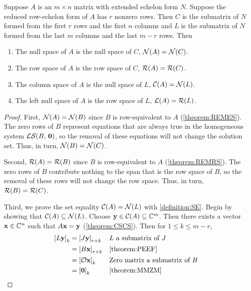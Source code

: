\documentclass{ximera}
\begin{document}
\begin{theorem}
\label{theorem:FS}
Suppose $A$ is an $m\times n$ matrix with extended echelon form $N$.
Suppose the reduced row-echelon form of $A$ has $r$ nonzero rows.
Then $C$ is the submatrix of $N$ formed from the first $r$ rows and
the first $n$ columns and $L$ is the submatrix of $N$ formed from the
last $m$ columns and the last $m-r$ rows.  Then
\begin{enumerate}
\item The null space of $A$ is the null space of $C$, $\mathcal{N}\!\left(A\right)=\mathcal{N}\!\left(C\right)$.
\item The row space of $A$ is the row space of $C$, $\mathcal{R}\!\left(A\right)=\mathcal{R}\!\left(C\right)$.
\item The column space of $A$ is the null space of $L$, $\mathcal{C}\!\left(A\right)=\mathcal{N}\!\left(L\right)$.
\item The left null space of $A$ is the row space of $L$, $\mathcal{L}\!\left(A\right)=\mathcal{R}\!\left(L\right)$.
\end{enumerate}

\begin{proof}
  First, $\mathcal{N}\!\left(A\right)=\mathcal{N}\!\left(B\right)$ since $B$ is row-equivalent to $A$
  (\ref{theorem:REMES}).  The zero rows of $B$ represent equations
  that are always true in the homogeneous system $\mathcal{LS}\!\left(B,\,\mathbf{0}\right)$, so
  the removal of these equations will not change the solution set.
  Thus, in turn, $\mathcal{N}\!\left(B\right)=\mathcal{N}\!\left(C\right)$.

  Second, $\mathcal{R}\!\left(A\right)=\mathcal{R}\!\left(B\right)$ since $B$ is row-equivalent to $A$
  (\ref{theorem:REMRS}).  The zero rows of $B$ contribute nothing to
  the span that is the row space of $B$, so the removal of these rows
  will not change the row space.  Thus, in turn, $\mathcal{R}\!\left(B\right)=\mathcal{R}\!\left(C\right)$.

  Third, we prove the set equality $\mathcal{C}\!\left(A\right)=\mathcal{N}\!\left(L\right)$ with
  \ref{definition:SE}.  Begin by showing that
  $\mathcal{C}\!\left(A\right)\subseteq\mathcal{N}\!\left(L\right)$.  Choose
  $\mathbf{y}\in\mathcal{C}\!\left(A\right)\subseteq\mathbb{C}^{m}$.  Then there exists a
  vector $\mathbf{x}\in\mathbb{C}^{n}$ such that $A\mathbf{x}=\mathbf{y}$
  (\ref{theorem:CSCS}).  Then for $1\leq k\leq m-r$,
  \begin{align*}
    \left\lbrack L\mathbf{y}\right\rbrack_{k}
    &=\left\lbrack J\mathbf{y}\right\rbrack_{r+k}
    &&\text{$L$ a submatrix of $J$}\\
    &=\left\lbrack B\mathbf{x}\right\rbrack_{r+k}
    &&\ref{theorem:PEEF}\\
    &=\left\lbrack\mathcal{O}\mathbf{x}\right\rbrack_{k}
    &&\text{Zero matrix a submatrix of $B$}\\
    &=\left\lbrack\mathbf{0}\right\rbrack_{k}
    &&\ref{theorem:MMZM}
  \end{align*}
  

\end{proof}
\end{theorem}
\end{document}
